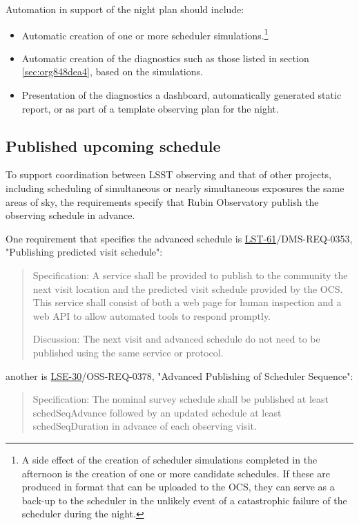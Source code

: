 Automation in support of the night plan should include:
\begin{itemize}
\item Automatic creation of one or more scheduler simulations.\footnote{A side effect of the creation of scheduler simulations completed in the afternoon is the creation of one or more candidate schedules. If these are produced in format that can be uploaded to the OCS, they can serve as a back-up to the scheduler in the unlikely event of a catastrophic failure of the scheduler during the night.}
\item Automatic creation of the diagnostics such as those listed in section \ref{sec:org848dea4}, based on the simulations.
\item Presentation of the diagnostics a dashboard, automatically generated static report, or as part of a template observing plan for the night.
\end{itemize}

\subsection{Published upcoming schedule}
\label{sec:orgb5ccc12}
To support coordination between LSST observing and that of other projects, including scheduling of simultaneous or nearly simultaneous exposures the same areas of sky, the requirements specify that Rubin Observatory publish the observing schedule in advance.

One requirement that specifies the advanced schedule is \href{https://ls.st/lse-61}{LST-61}/DMS-REQ-0353, "Publishing predicted visit schedule":
\begin{quote}
Specification: A service shall be provided to publish to the community the next visit location and the predicted visit schedule provided by the OCS. This service shall consist of both a web page for human inspection and a web API to allow automated tools to respond promptly.

Discussion: The next visit and advanced schedule do not need to be published using the same service or protocol.
\end{quote}
another is \href{https://ls.st/lse-30}{LSE-30}/OSS-REQ-0378, "Advanced Publishing of Scheduler Sequence":
\begin{quote}
Specification: The nominal survey schedule shall be published at least schedSeqAdvance
followed by an updated schedule at least schedSeqDuration in advance of each observing
visit.
\end{quote}

